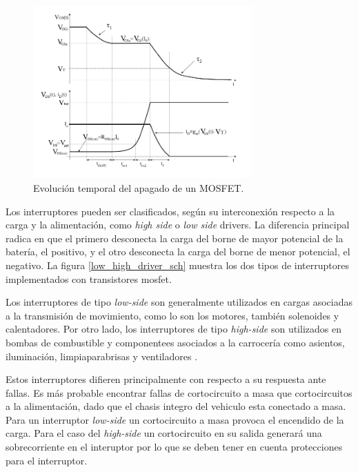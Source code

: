 \documentclass[10pt,a4paper]{article}
\begin{document}
\begin{itemize}
\begin{figure}[h!]
	\begin{center}
		\includegraphics[width=0.75\textwidth]{shutdown_time.pdf}
		\caption{Evolución temporal del apagado de un MOSFET.}
		\label{apagado_time}
	\end{center}
\end{figure}
\FloatBarrier

Los interruptores pueden ser clasificados, según su interconexión respecto a la
carga y la alimentación, como \emph{high side} o \emph{low side} drivers. 
La diferencia principal radica en que el primero desconecta la
carga del borne de mayor potencial de la batería, el positivo, y el otro
desconecta la carga del borne de menor potencial, el negativo. La figura
\ref{low_high_driver_sch} muestra los dos tipos de interruptores implementados
con transistores mosfet.

Los interruptores de tipo \emph{low-side} son generalmente utilizados en cargas
asociadas a la transmisión de movimiento, como lo son los motores, también
solenoides y calentadores. Por otro lado, los interruptores de tipo
\emph{high-side} son utilizados en bombas de combustible y componentees
asociados a la carrocería como asientos, iluminación, limpiaparabrisas y
ventiladores \cite{DigKey2016}.

Estos interruptores difieren principalmente con respecto a su respuesta ante
fallas. Es más probable encontrar fallas de cortocircuito a masa que
cortocircuitos a la alimentación, dado que el chasis integro del vehiculo esta
conectado a masa. Para un interruptor \emph{low-side} un cortocircuito a masa
provoca el encendido de la carga. Para el caso del \emph{high-side} un
cortocircuito en su salida generará una sobrecorriente en el interuptor por lo
que se deben tener en cuenta protecciones para el interruptor.


\end{itemize}
\end{document}
